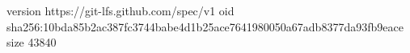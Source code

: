 version https://git-lfs.github.com/spec/v1
oid sha256:10bda85b2ac387fc3744babe4d1b25ace7641980050a67adb8377da93fb9eace
size 43840

